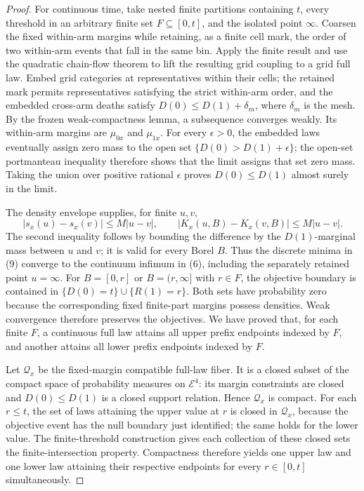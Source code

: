 \documentclass{article}
\begin{document}
\begin{proof}
For continuous time, take nested finite partitions containing \(t\), every threshold in an arbitrary finite set \(F\subseteq[0,t]\), and the isolated point \(\infty\).  Coarsen the fixed within-arm margins while retaining, as a finite cell mark, the order of two within-arm events that fall in the same bin.  Apply the finite result and use the quadratic chain-flow theorem to lift the resulting grid coupling to a grid full law.  Embed grid categories at representatives within their cells; the retained mark permits representatives satisfying the strict within-arm order, and the embedded cross-arm deaths satisfy \(D(0)\leq D(1)+\delta_m\), where \(\delta_m\) is the mesh.  By the frozen weak-compactness lemma, a subsequence converges weakly.  Its within-arm margins are \(\mu_{0x}\) and \(\mu_{1x}\).  For every \(\epsilon>0\), the embedded laws eventually assign zero mass to the open set \(\{D(0)>D(1)+\epsilon\}\); the open-set portmanteau inequality therefore shows that the limit assigns that set zero mass.  Taking the union over positive rational \(\epsilon\) proves \(D(0)\leq D(1)\) almost surely in the limit.

The density envelope supplies, for finite \(u,v\),
\[
|s_x(u)-s_x(v)|\leq M|u-v|,
\qquad
|K_x(u,B)-K_x(v,B)|
\leq M|u-v|. \tag{11}
\]
The second inequality follows by bounding the difference by the \(D(1)\)-marginal mass between \(u\) and \(v\); it is valid for every Borel \(B\).  Thus the discrete minima in (9) converge to the continuum infimum in (6), including the separately retained point \(u=\infty\).  For \(B=[0,r]\) or \(B=(r,\infty]\) with \(r\in F\), the objective boundary is contained in \(\{D(0)=t\}\cup\{R(1)=r\}\).  Both sets have probability zero because the corresponding fixed finite-part margins possess densities.  Weak convergence therefore preserves the objectives.  We have proved that, for each finite \(F\), a continuous full law attains all upper prefix endpoints indexed by \(F\), and another attains all lower prefix endpoints indexed by \(F\).

Let \(\mathcal Q_x\) be the fixed-margin compatible full-law fiber.  It is a closed subset of the compact space of probability measures on \(\mathcal E^4\): its margin constraints are closed and \(D(0)\leq D(1)\) is a closed support relation.  Hence \(\mathcal Q_x\) is compact.  For each \(r\leq t\), the set of laws attaining the upper value at \(r\) is closed in \(\mathcal Q_x\), because the objective event has the null boundary just identified; the same holds for the lower value.  The finite-threshold construction gives each collection of these closed sets the finite-intersection property.  Compactness therefore yields one upper law and one lower law attaining their respective endpoints for every \(r\in[0,t]\) simultaneously.


\end{proof}
\end{document}
